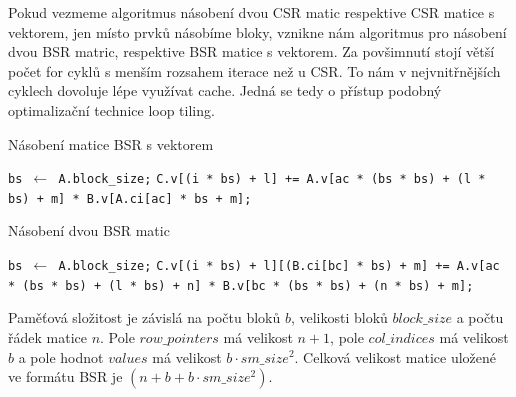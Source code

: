 Pokud vezmeme algoritmus násobení dvou CSR matic respektive CSR matice s vektorem, jen místo prvků násobíme bloky, vznikne nám algoritmus pro násobení dvou BSR matric, respektive BSR matice s vektorem. Za povšimnutí stojí větší počet for cyklů s menším rozsahem iterace než u CSR. To nám v nejvnitřnějších cyklech dovoluje lépe využívat cache. Jedná se tedy o přístup podobný optimalizační technice loop tiling\cite{Wolf:1991:DLO:113445.113449}.

\label{alg:bsr-mvm}
\begin{algorithm}[H]
	\caption{Násobení matice BSR s vektorem}\label{bsr-mvm}
	\begin{algorithmic}[1]
		\State \texttt{bs $\gets$ A.block\_size;}
						\State \texttt{C.v[(i * bs) + l] += A.v[ac * (bs * bs) + (l * bs) + m] * B.v[A.ci[ac] * bs + m];}
					\EndFor
				\EndFor
			\EndFor
		\EndFor
		\EndProcedure
	\end{algorithmic}
\end{algorithm}

\label{alg:bsr-mmm}
\begin{algorithm}[H]
	\caption{Násobení dvou BSR matic}\label{bsr-mmm}
	\begin{algorithmic}[1]
		\State \texttt{bs $\gets$ A.block\_size;}
								\State \texttt{C.v[(i * bs) + l][(B.ci[bc] * bs) + m] += A.v[ac * (bs * bs) + (l * bs) + n] * B.v[bc * (bs * bs) + (n * bs) + m];}
							\EndFor
						\EndFor
					\EndFor
				\EndFor
			\EndFor
		\EndFor
		\EndProcedure
	\end{algorithmic}
\end{algorithm}

Paměťová složitost je závislá na počtu bloků $b$, velikosti bloků $block\_size$ a počtu řádek matice $n$. Pole $row\_pointers$ má velikost $n+1$, pole $col\_indices$ má velikost $b$ a pole hodnot $values$ má velikost $b \cdot sm\_size^2$. Celková velikost matice uložené ve formátu BSR je \bigO$(n + b + b \cdot sm\_size^2)$. 


